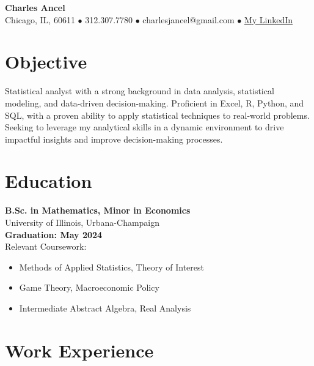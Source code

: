 \documentclass[10pt]{article}
\begin{document}
\begin{center}
{\Large\textbf{Charles Ancel}}\\
\vspace{5pt}
\small{Chicago, IL, 60611 \(\bullet\) 312.307.7780 \(\bullet\) charlesjancel@gmail.com \(\bullet\) \href{https://www.linkedin.com/in/charles-j-ancel/}{My LinkedIn}}
\end{center}

\vspace{-10pt}
\section*{Objective}
\vspace{0pt}
Statistical analyst with a strong background in data analysis, statistical modeling, and data-driven decision-making. Proficient in Excel, R, Python, and SQL, with a proven ability to apply statistical techniques to real-world problems. Seeking to leverage my analytical skills in a dynamic environment to drive impactful insights and improve decision-making processes.

\vspace{-10pt}
\section*{Education}
\vspace{0pt}
\begin{multicols}{2}
\textbf{B.Sc. in Mathematics, Minor in Economics} \\
University of Illinois, Urbana-Champaign \\
\textbf{Graduation: May 2024} \\
Relevant Coursework:
\begin{itemize}[noitemsep,nosep]
    \item Methods of Applied Statistics, Theory of Interest
    \item Game Theory, Macroeconomic Policy
    \item Intermediate Abstract Algebra, Real Analysis
\end{itemize}
\end{multicols}

\vspace{-10pt}
\section*{Work Experience}
\vspace{0pt}
\end{document}
